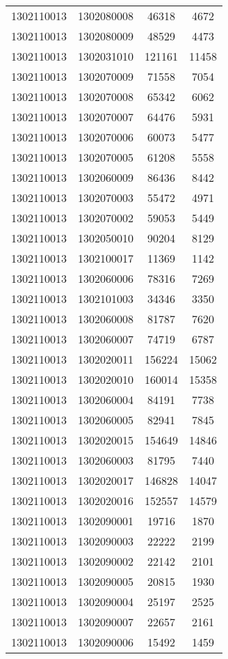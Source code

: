 \begin{longtable}[h]{llcc}
		1302110013 & 1302080008 & 46318 & 4672\\
		1302110013 & 1302080009 & 48529 & 4473\\
		1302110013 & 1302031010 & 121161 & 11458\\
		1302110013 & 1302070009 & 71558 & 7054\\
		1302110013 & 1302070008 & 65342 & 6062\\
		1302110013 & 1302070007 & 64476 & 5931\\
		1302110013 & 1302070006 & 60073 & 5477\\
		1302110013 & 1302070005 & 61208 & 5558\\
		1302110013 & 1302060009 & 86436 & 8442\\
		1302110013 & 1302070003 & 55472 & 4971\\
		1302110013 & 1302070002 & 59053 & 5449\\
		1302110013 & 1302050010 & 90204 & 8129\\
		1302110013 & 1302100017 & 11369 & 1142\\
		1302110013 & 1302060006 & 78316 & 7269\\
		1302110013 & 1302101003 & 34346 & 3350\\
		1302110013 & 1302060008 & 81787 & 7620\\
		1302110013 & 1302060007 & 74719 & 6787\\
		1302110013 & 1302020011 & 156224 & 15062\\
		1302110013 & 1302020010 & 160014 & 15358\\
		1302110013 & 1302060004 & 84191 & 7738\\
		1302110013 & 1302060005 & 82941 & 7845\\
		1302110013 & 1302020015 & 154649 & 14846\\
		1302110013 & 1302060003 & 81795 & 7440\\
		1302110013 & 1302020017 & 146828 & 14047\\
		1302110013 & 1302020016 & 152557 & 14579\\
		1302110013 & 1302090001 & 19716 & 1870\\
		1302110013 & 1302090003 & 22222 & 2199\\
		1302110013 & 1302090002 & 22142 & 2101\\
		1302110013 & 1302090005 & 20815 & 1930\\
		1302110013 & 1302090004 & 25197 & 2525\\
		1302110013 & 1302090007 & 22657 & 2161\\
		1302110013 & 1302090006 & 15492 & 1459\\

\end{longtable}
